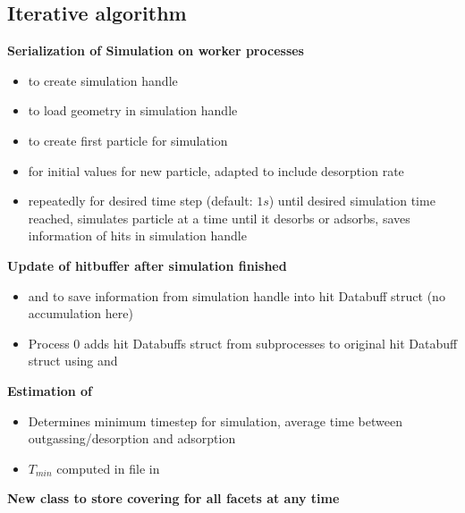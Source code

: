 \subsection{Iterative algorithm}
\textbf{Serialization of Simulation on worker processes}
\begin{itemize}[noitemsep,topsep=0pt]
\item {} to create simulation handle
\item {} to load geometry in simulation handle
\item {} to create first particle for simulation
\item  {} for initial values for new particle, adapted to include desorption rate
\item {} repeatedly for desired time step (default: $1s$) until desired simulation time reached, simulates particle at a time until it desorbs or adsorbs, saves information of hits in simulation handle 
\end{itemize}
\bigskip
\textbf{Update of hitbuffer after simulation finished}
\begin{itemize}[noitemsep,topsep=0pt]
\item {} and  to save information from simulation handle into hit Databuff struct (no accumulation here)
\item Process 0 adds hit Databuffs struct from subprocesses to original hit Databuff struct using  and 
\end{itemize}
\bigskip
\textbf{Estimation of }
\begin{itemize}[noitemsep,topsep=0pt]
\item Determines minimum timestep for simulation, average time between outgassing/desorption and adsorption
\item $T_{min}$ computed in  file in 
\end{itemize}
\bigskip
\textbf{New class to store covering for all facets at any time}
